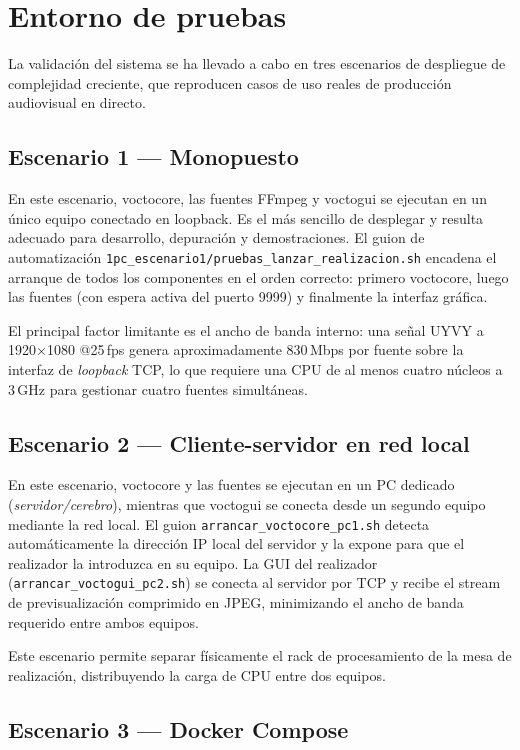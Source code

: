 \section{Entorno de pruebas}

La validación del sistema se ha llevado a cabo en tres escenarios de despliegue
de complejidad creciente, que reproducen casos de uso reales de producción audiovisual
en directo.

\subsection{Escenario 1 --- Monopuesto}

En este escenario, voctocore, las fuentes FFmpeg y voctogui se ejecutan en un único
equipo conectado en loopback. Es el más sencillo de desplegar y resulta adecuado para
desarrollo, depuración y demostraciones. El guion de automatización
\texttt{1pc\_escenario1/pruebas\_lanzar\_realizacion.sh} encadena el arranque de todos
los componentes en el orden correcto: primero voctocore, luego las fuentes (con espera
activa del puerto 9999) y finalmente la interfaz gráfica.

El principal factor limitante es el ancho de banda interno: una señal UYVY a
1920×1080 @25\,fps genera aproximadamente 830\,Mbps por fuente sobre la interfaz de
\textit{loopback} TCP, lo que requiere una CPU de al menos cuatro núcleos a 3\,GHz
para gestionar cuatro fuentes simultáneas.

\subsection{Escenario 2 --- Cliente-servidor en red local}

En este escenario, voctocore y las fuentes se ejecutan en un PC dedicado
(\textit{servidor/cerebro}), mientras que voctogui se conecta desde un segundo
equipo mediante la red local. El guion \texttt{arrancar\_voctocore\_pc1.sh} detecta
automáticamente la dirección IP local del servidor y la expone para que el realizador
la introduzca en su equipo. La GUI del realizador (\texttt{arrancar\_voctogui\_pc2.sh})
se conecta al servidor por TCP y recibe el stream de previsualización comprimido en
JPEG, minimizando el ancho de banda requerido entre ambos equipos.

Este escenario permite separar físicamente el rack de procesamiento de la mesa de
realización, distribuyendo la carga de CPU entre dos equipos.

\subsection{Escenario 3 --- Docker Compose}

